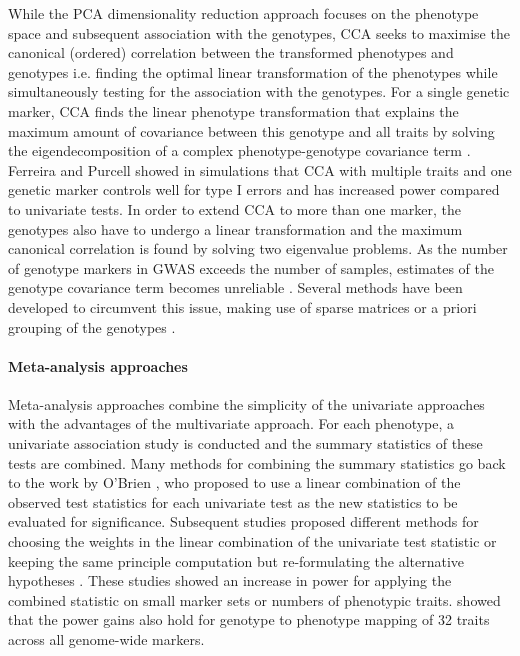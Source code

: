 While the PCA dimensionality reduction approach focuses on the phenotype space and subsequent association with the genotypes, CCA  seeks to maximise the canonical (ordered) correlation between the transformed phenotypes and genotypes i.e. finding the optimal linear transformation of the phenotypes while simultaneously testing for the association with the genotypes.  For a single genetic marker, CCA finds the linear phenotype transformation that explains the maximum amount of covariance between this genotype and all traits by solving the eigendecomposition of a complex phenotype-genotype covariance term \citep{Yang2012b}. Ferreira and Purcell \parencite*{Ferreira2009} showed in simulations that CCA with multiple traits and one genetic marker controls well for type I errors and has increased power compared to univariate tests. In order to extend CCA to more than one marker, the genotypes also have to undergo a linear transformation and the maximum canonical correlation is found by solving two eigenvalue problems. As the number of genotype markers in GWAS exceeds the number of samples, estimates of the genotype covariance term becomes unreliable \citep{Schaefer2005}. Several methods have been developed to circumvent this issue, making use of sparse matrices \citep{Parkhomenko2009} or a priori grouping of the genotypes \citep{Naylor2010}. 

\paragraph{Meta-analysis approaches} Meta-analysis approaches combine the simplicity of the univariate approaches with the advantages of the multivariate approach. For each phenotype, a univariate association study is conducted and the summary statistics of these tests are combined. Many methods for combining the summary statistics \citep{Xu2003,Yang2010,Bolormaa2014} go back to the work by O'Brien \citep{OBrien1984}, who proposed to use a linear combination of the observed test statistics for each univariate test as the new statistics to be evaluated for significance. Subsequent studies proposed different methods for choosing the weights in the linear combination of the univariate test statistic or keeping the same principle computation but re-formulating the alternative hypotheses \citep{Yang2010,Xu2003}. These studies showed an increase in power for applying the combined statistic on small marker sets or numbers of phenotypic traits. \citet{Bolormaa2014} showed that the power gains also hold for genotype to phenotype mapping of 32 traits across all genome-wide markers. 


